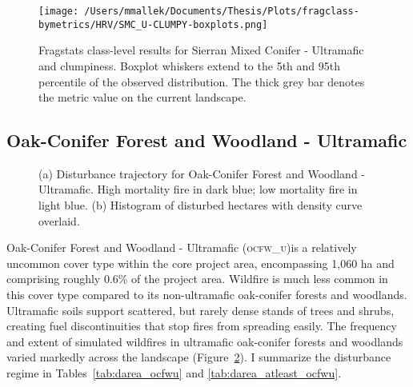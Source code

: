 \begin{figure}[!htbp]
\centering
    \texttt{[image: /Users/mmallek/Documents/Thesis/Plots/fragclass-bymetrics/HRV/SMC\_U-CLUMPY-boxplots.png]}
  \caption{Fragstats class-level results for Sierran Mixed Conifer - Ultramafic and clumpiness. Boxplot whiskers extend to the 5th and 95th percentile of the observed distribution. The thick grey bar denotes the metric value on the current landscape.}
  \label{fig:smcu_clumpy}
\end{figure}




\clearpage
\subsection{Oak-Conifer Forest and Woodland - Ultramafic} 
\begin{figure}[!htbp]
  \centering
  \caption{\small (a) Disturbance trajectory for Oak-Conifer Forest and Woodland - Ultramafic. High mortality fire in dark blue; low mortality fire in light blue. (b) Histogram of disturbed hectares with density curve overlaid.} 
  \label{fig:darea_ocfwu}
\end{figure}

Oak-Conifer Forest and Woodland - Ultramafic (\textsc{ocfw\_u})is a relatively uncommon cover type within the core project area, encompassing 1,060 ha and comprising roughly 0.6\% of the project area. Wildfire is much less common in this cover type compared to its non-ultramafic oak-conifer forests and woodlands. Ultramafic soils support scattered, but rarely dense stands of trees and shrubs, creating fuel discontinuities that stop fires from spreading easily. The frequency and extent of simulated wildfires in ultramafic oak-conifer forests and woodlands varied markedly across the landscape (Figure~\ref{fig:darea_ocfwu}). I summarize the disturbance regime in Tables~\ref{tab:darea_ocfwu} and \ref{tab:darea_atleast_ocfwu}.

